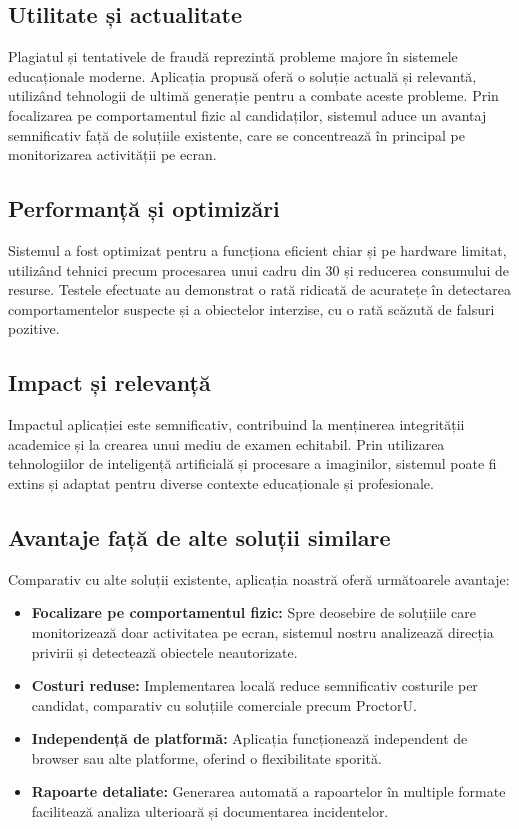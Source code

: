 \documentclass[12pt,a4paper]{article}
\begin{document}
\subsection{Utilitate și actualitate}

Plagiatul și tentativele de fraudă reprezintă probleme majore în sistemele educaționale moderne. Aplicația propusă oferă o soluție actuală și relevantă, utilizând tehnologii de ultimă generație pentru a combate aceste probleme. Prin focalizarea pe comportamentul fizic al candidaților, sistemul aduce un avantaj semnificativ față de soluțiile existente, care se concentrează în principal pe monitorizarea activității pe ecran.

\subsection{Performanță și optimizări}

Sistemul a fost optimizat pentru a funcționa eficient chiar și pe hardware limitat, utilizând tehnici precum procesarea unui cadru din 30 și reducerea consumului de resurse. Testele efectuate au demonstrat o rată ridicată de acuratețe în detectarea comportamentelor suspecte și a obiectelor interzise, cu o rată scăzută de falsuri pozitive.

\subsection{Impact și relevanță}

Impactul aplicației este semnificativ, contribuind la menținerea integrității academice și la crearea unui mediu de examen echitabil. Prin utilizarea tehnologiilor de inteligență artificială și procesare a imaginilor, sistemul poate fi extins și adaptat pentru diverse contexte educaționale și profesionale.

\subsection{Avantaje față de alte soluții similare}

Comparativ cu alte soluții existente, aplicația noastră oferă următoarele avantaje:
\begin{itemize}
    \item \textbf{Focalizare pe comportamentul fizic:} Spre deosebire de soluțiile care monitorizează doar activitatea pe ecran, sistemul nostru analizează direcția privirii și detectează obiectele neautorizate.
    \item \textbf{Costuri reduse:} Implementarea locală reduce semnificativ costurile per candidat, comparativ cu soluțiile comerciale precum ProctorU.
    \item \textbf{Independență de platformă:} Aplicația funcționează independent de browser sau alte platforme, oferind o flexibilitate sporită.
    \item \textbf{Rapoarte detaliate:} Generarea automată a rapoartelor în multiple formate facilitează analiza ulterioară și documentarea incidentelor.
\end{itemize}
\end{document}
